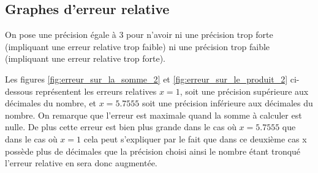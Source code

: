 \documentclass{article}
\begin{document}
\subsection*{Graphes d'erreur relative}

On pose une précision égale à 3 pour n'avoir ni une précision trop forte (impliquant une erreur relative trop faible) ni une précision trop faible (impliquant une erreur relative trop forte).

Les figures \ref{fig:erreur_sur_la_somme_2} et \ref{fig:erreur_sur_le_produit_2} ci-dessous représentent les erreurs relatives ${x = 1}$, soit une précision supérieure aux décimales du nombre, et ${x = 5.7555}$ soit une précision inférieure aux décimales du nombre. On remarque que l'erreur est maximale quand la somme à calculer est nulle. De plus cette erreur est bien plus grande dans le cas où ${x=5.7555}$ que dans le cas où ${x=1}$ cela peut s'expliquer par le fait que dans ce deuxième cas x possède plus de décimales que la précision choisi ainsi le nombre étant tronqué l'erreur relative en sera donc augmentée. 
\end{document}
